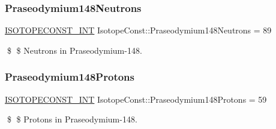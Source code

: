 \subsubsection{\texorpdfstring{Praseodymium148\+Neutrons}{Praseodymium148Neutrons}}
{\footnotesize\ttfamily \mbox{\hyperlink{group___isotope_const-_macros_ga5f18360b3e99483a35c32d789e62621c}{I\+S\+O\+T\+O\+P\+E\+C\+O\+N\+S\+T\+\_\+\+I\+NT}} Isotope\+Const\+::\+Praseodymium148\+Neutrons = 89}

\$ \$ Neutrons in Praseodymium-\/148. \mbox{\label{group___isotope_const-_praseodymium-_pr148_ga5943eff9f8db7dd50465c9ed0b5cf8b3}} 
\subsubsection{\texorpdfstring{Praseodymium148\+Protons}{Praseodymium148Protons}}
{\footnotesize\ttfamily \mbox{\hyperlink{group___isotope_const-_macros_ga5f18360b3e99483a35c32d789e62621c}{I\+S\+O\+T\+O\+P\+E\+C\+O\+N\+S\+T\+\_\+\+I\+NT}} Isotope\+Const\+::\+Praseodymium148\+Protons = 59}

\$ \$ Protons in Praseodymium-\/148. 